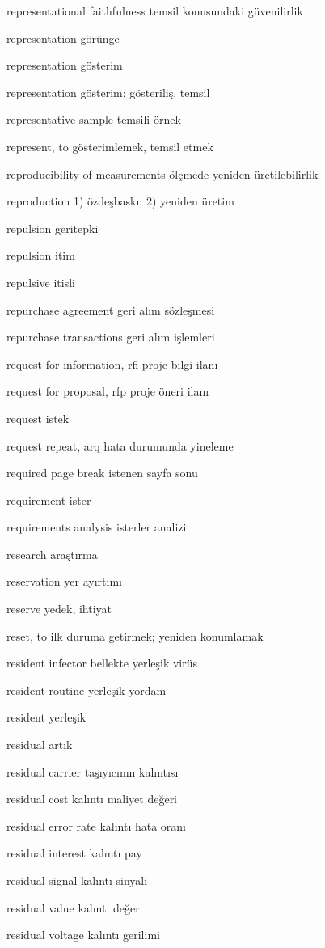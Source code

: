 \documentclass[12pt,fleqn]{article}\usepackage{../../common}
\begin{document}
representational faithfulness temsil konusundaki güvenilirlik

representation görünge

representation gösterim

representation gösterim; gösteriliş, temsil

representative sample temsili örnek

represent, to gösterimlemek, temsil etmek

reproducibility of measurements ölçmede yeniden üretilebilirlik

reproduction 1) özdeşbaskı; 2) yeniden üretim

repulsion geritepki

repulsion itim

repulsive itisli

repurchase agreement geri alım sözleşmesi

repurchase transactions geri alım işlemleri

request for information, rfi proje bilgi ilanı

request for proposal, rfp proje öneri ilanı

request istek

request repeat, arq hata durumunda yineleme

required page break istenen sayfa sonu

requirement ister

requirements analysis isterler analizi

research araştırma

reservation yer ayırtımı

reserve yedek, ihtiyat

reset, to ilk duruma getirmek; yeniden konumlamak

resident infector bellekte yerleşik virüs

resident routine yerleşik yordam

resident yerleşik

residual artık

residual carrier taşıyıcının kalıntısı

residual cost kalıntı maliyet değeri

residual error rate kalıntı hata oranı

residual interest kalıntı pay

residual signal kalıntı sinyali

residual value kalıntı değer

residual voltage kalıntı gerilimi
\end{document}
